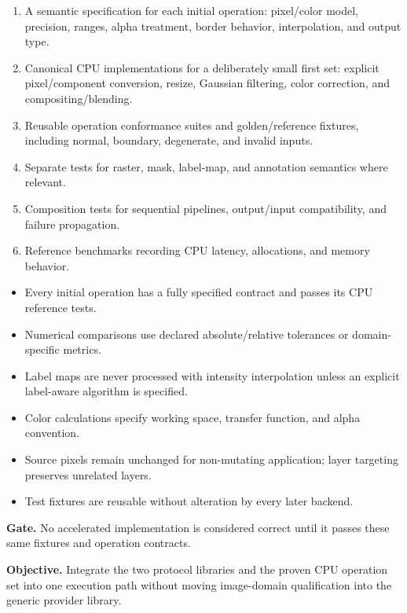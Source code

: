 \deliverables
\begin{enumerate}
  \item A semantic specification for each initial operation: pixel/color model, precision, ranges, alpha treatment, border behavior, interpolation, and output type.
  \item Canonical CPU implementations for a deliberately small first set: explicit pixel/component conversion, resize, Gaussian filtering, color correction, and compositing/blending.
  \item Reusable operation conformance suites and golden/reference fixtures, including normal, boundary, degenerate, and invalid inputs.
  \item Separate tests for raster, mask, label-map, and annotation semantics where relevant.
  \item Composition tests for sequential pipelines, output/input compatibility, and failure propagation.
  \item Reference benchmarks recording CPU latency, allocations, and memory behavior.
\end{enumerate}

\exitcriteria
\begin{itemize}
  \item Every initial operation has a fully specified contract and passes its CPU reference tests.
  \item Numerical comparisons use declared absolute/relative tolerances or domain-specific metrics.
  \item Label maps are never processed with intensity interpolation unless an explicit label-aware algorithm is specified.
  \item Color calculations specify working space, transfer function, and alpha convention.
  \item Source pixels remain unchanged for non-mutating application; layer targeting preserves unrelated layers.
  \item Test fixtures are reusable without alteration by every later backend.
\end{itemize}

\textbf{Gate.} No accelerated implementation is considered correct until it passes these same fixtures and operation contracts.


\textbf{Objective.} Integrate the two protocol libraries and the proven CPU operation set into one execution path without moving image-domain qualification into the generic provider library.

